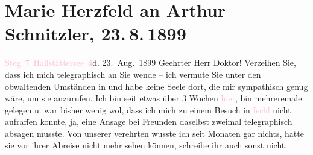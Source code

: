 

               \section[Marie Herzfeld an Arthur Schnitzler, 23. 8. 1899]{ Marie Herzfeld an Arthur Schnitzler, 23. 8. 1899}\nopagebreak{}\rehead{ }\normalsize\beginnumbering{} \toendnotes[C]{\smallbreak\pagebreak[2]} 
\toendnotes[C]{\smallbreak}\pstart
           \raggedleft{}{\pb}\textcolor{pink}{Steg 7 Hallstättersee 4}{}\ledrightnote{\textcolor{pink}{Steeg}}{\\}d.
                     23. Aug. 1899\pend
           \pstart\center{}Geehrter Herr Doktor!\pend\pstart
           Verzeihen Sie, dass ich mich telegraphisch an Sie wende – ich vermute Sie unter den
               obwaltenden Umständen in \label{K_L02591-1v}\label{K_L02591-1h} und
               habe keine Seele dort, die mir sympathisch genug wäre, um sie anzurufen. Ich bin seit
               etwas über 3 Wochen \textcolor{pink}{hier}{}, bin
               mehreremale gelegen u. war bisher wenig {\pb}wol, dass ich
               mich zu einem Besuch in \textcolor{pink}{Ischl}{}\ledrightnote{\textcolor{pink}{Bad Ischl}} nicht aufraffen
               konnte, ja, eine Ansage bei Freunden daselbst zweimal telegraphisch absagen musste.
               Von unserer verehrten \label{K_L02591-13v}\label{K_L02591-13h} wusste ich seit Monaten \uline{gar} nichts,
               hatte sie vor ihrer Abreise nicht mehr sehen können, schreibe ihr auch sonst nicht.
